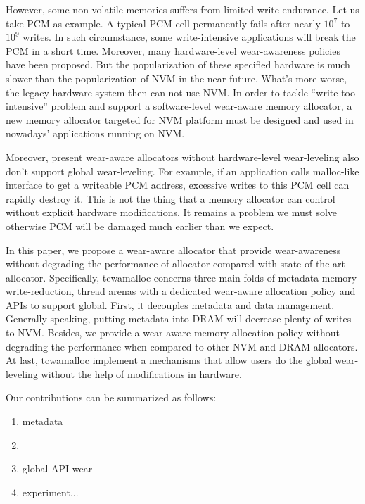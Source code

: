 \documentclass{vldb}
\begin{document}
However, some non-volatile memories suffers from limited write endurance. 
Let us take PCM as example. A typical PCM cell permanently fails after nearly $10^7$ to $10^9$ writes. 
In such circumstance, some write-intensive applications will break the PCM in a short time. 
Moreover, many hardware-level wear-awareness policies have been proposed. 
But the popularization of these specified hardware is much slower than the popularization of NVM in the near future. 
What’s more worse, the legacy hardware system then can not use NVM. 
In order to tackle ``write-too-intensive'' problem and support a software-level wear-aware memory allocator, a new memory allocator targeted for NVM platform must be designed and used in nowadays’ applications running on NVM.

Moreover, present wear-aware allocators without hardware-level wear-leveling also don’t support global wear-leveling. 
For example, if an application calls malloc-like interface to get a writeable PCM address, excessive writes to this PCM cell can rapidly destroy it. 
This is not the thing that a memory allocator can control without explicit hardware modifications. It remains a problem we must solve otherwise PCM will be damaged much earlier than we expect.

In this paper, we propose a wear-aware allocator that provide wear-awareness without degrading the performance of allocator compared with state-of-the art allocator. 
Specifically, tcwamalloc concerns three main folds of metadata memory write-reduction, thread arenas with a dedicated wear-aware allocation policy and APIs to support global. 
First, it decouples metadata and data management. Generally speaking, putting metadata into DRAM will decrease plenty of writes to NVM. 
Besides, we provide a wear-aware memory allocation policy without degrading the performance when compared to other NVM and DRAM allocators. 
At last, tcwamalloc implement a mechanisms that allow users do the global wear-leveling without the help of modifications in hardware.

Our contributions can be summarized as follows:
\begin{enumerate}
    \item metadata %
    \item %
    \item global API wear
    \item experiment...
\end{enumerate}
\end{document}
